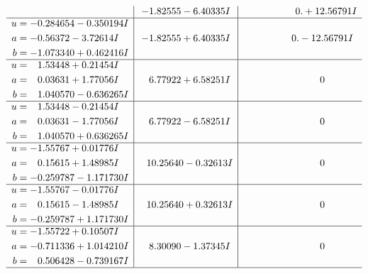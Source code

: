 \documentclass[1p]{elsarticle_modified}
\theoremstyle{definition}
\begin{document}
$$\begin{array}{c|c|c}
 & -1.82555 - 6.40335 I & \phantom{-0.000000 -}0. + 12.56791 I \\ \hline\begin{aligned}
u &= -0.284654 - 0.350194 I \\
a &= -0.56372 - 3.72614 I \\
b &= -1.073340 + 0.462416 I\end{aligned}
 & -1.82555 + 6.40335 I & \phantom{-0.000000 } 0. - 12.56791 I \\ \hline\begin{aligned}
u &= \phantom{-}1.53448 + 0.21454 I \\
a &= \phantom{-}0.03631 + 1.77056 I \\
b &= \phantom{-}1.040570 - 0.636265 I\end{aligned}
 & \phantom{-}6.77922 + 6.58251 I & \phantom{-0.000000 } 0 \\ \hline\begin{aligned}
u &= \phantom{-}1.53448 - 0.21454 I \\
a &= \phantom{-}0.03631 - 1.77056 I \\
b &= \phantom{-}1.040570 + 0.636265 I\end{aligned}
 & \phantom{-}6.77922 - 6.58251 I & \phantom{-0.000000 } 0 \\ \hline\begin{aligned}
u &= -1.55767 + 0.01776 I \\
a &= \phantom{-}0.15615 + 1.48985 I \\
b &= -0.259787 - 1.171730 I\end{aligned}
 & \phantom{-}10.25640 - 0.32613 I & \phantom{-0.000000 } 0 \\ \hline\begin{aligned}
u &= -1.55767 - 0.01776 I \\
a &= \phantom{-}0.15615 - 1.48985 I \\
b &= -0.259787 + 1.171730 I\end{aligned}
 & \phantom{-}10.25640 + 0.32613 I & \phantom{-0.000000 } 0 \\ \hline\begin{aligned}
u &= -1.55722 + 0.10507 I \\
a &= -0.711336 + 1.014210 I \\
b &= \phantom{-}0.506428 - 0.739167 I\end{aligned}
 & \phantom{-}8.30090 - 1.37345 I & \phantom{-0.000000 } 0\\
 \hline 
 \end{array}$$\newpage$$\begin{array}{c|c|c}  

\end{array}$$
\end{document}
